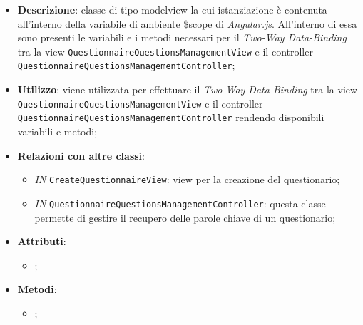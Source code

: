 					\begin{itemize}
						\item \textbf{Descrizione}: classe di tipo modelview la cui istanziazione è contenuta all'interno della variabile di ambiente \$scope di \textit{Angular.js}. All'interno di essa sono presenti le variabili e i metodi necessari per il \textit{Two-Way Data-Binding} tra la view \texttt{QuestionnaireQuestionsManagementView} e il controller \texttt{QuestionnaireQuestionsManagementController};
						\item \textbf{Utilizzo}: viene utilizzata per effettuare il \textit{Two-Way Data-Binding} tra la view \texttt{QuestionnaireQuestionsManagementView} e il controller \texttt{QuestionnaireQuestionsManagementController} rendendo disponibili variabili e metodi;
						\item \textbf{Relazioni con altre classi}: 
						\begin{itemize}
							\item \textit{IN} \texttt{CreateQuestionnaireView}: view per la creazione del questionario; 
							\item \textit{IN} \texttt{QuestionnaireQuestionsManagementController}: questa classe permette di gestire il recupero delle parole chiave di un questionario;
						\end{itemize}
						\item \textbf{Attributi}: 
						\begin{itemize}
							\item ;
						\end{itemize}
						\item \textbf{Metodi}: 
						\begin{itemize}
							\item ;
						\end{itemize}
					\end{itemize}
					
						
							